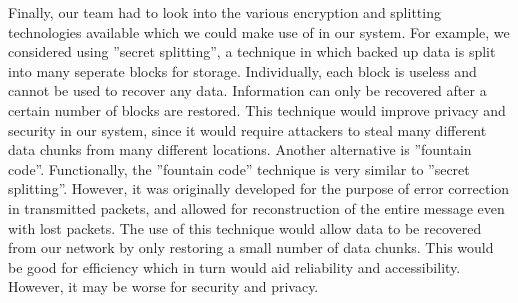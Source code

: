 Finally, our team had to look into the various encryption and splitting technologies available which we could make use of in our system.  For example, we considered using ''secret splitting'', a technique in which backed up data is split into many seperate blocks for storage.  Individually, each block is useless and cannot be used to recover any data.  Information can only be recovered after a certain number of blocks are restored.  This technique would improve privacy and security in our system, since it would require attackers to steal many different data chunks from many different locations.  Another alternative is ''fountain code''.  Functionally, the ''fountain code'' technique is very similar to ''secret splitting''.  However, it was originally developed for the purpose of error correction in transmitted packets, and allowed for reconstruction of the entire message even with lost packets.  The use of this technique would allow data to be recovered from our network by only restoring a small number of data chunks.  This would be good for efficiency which in turn would aid reliability and accessibility.  However, it may be worse for security and privacy.